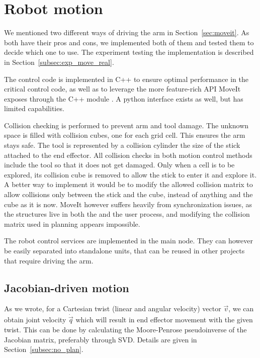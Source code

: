 \documentclass[buriama8_dp.tex]{subfiles}
\begin{document}
\section{Robot motion}
\label{sec:rob_impl}

We mentioned two different ways of driving the arm in Section~\ref{sec:moveit}. As both have their pros and cons, we implemented both of them and tested them to decide which one to use. The experiment testing the implementation is described in Section~\ref{subsec:exp_move_real}.

The control code is implemented in C++ to ensure optimal performance in the critical control code, as well as to leverage the more feature-rich API MoveIt exposes through the C++ module . A python interface exists as well, but has limited capabilities.

Collision checking is performed to prevent arm and tool damage. The unknown space is filled with collision cubes, one for each grid cell. This ensures the arm stays safe. The tool is represented by a collision cylinder the size of the stick attached to the end effector. All collision checks in both motion control methods include the tool so that it does not get damaged. Only when a cell is to be explored, its collision cube is removed to allow the stick to enter it and explore it. A better way to implement it would be to modify the allowed collision matrix to allow collisions only between the stick and the cube, instead of anything and the cube as it is now. MoveIt however suffers heavily from synchronization issues, as the structures live in both the  and the user process, and modifying the collision matrix used in planning appears impossible.

The robot control services are implemented in the main node. They can however be easily separated into standalone units, that can be reused in other projects that require driving the arm.

\subsection{Jacobian-driven motion}
\label{subsec:impl_drv_jacob}

As we wrote, for a Cartesian twist (linear and angular velocity) vector \(\vec v\), we can obtain joint velocity \(\dot{\vec q}\) which will result in end effector movement with the given twist. This can be done by calculating the Moore-Penrose pseudoinverse of the Jacobian matrix, preferably through SVD. Details are given in Section~\ref{subsec:no_plan}.
\end{document}
